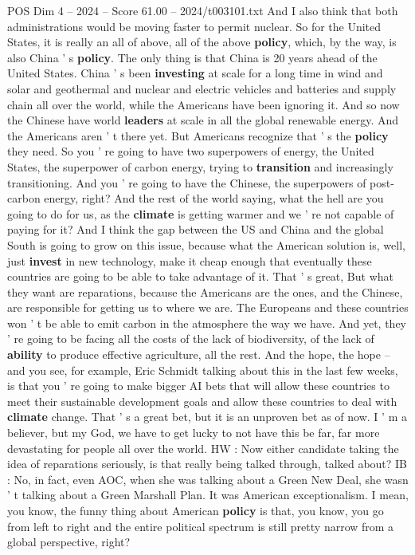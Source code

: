 \begin{textsample}{POS Dim 4 – 2024 – Score 61.00 – 2024/t003101.txt}
And I also think that both administrations would be moving faster to permit nuclear.
So for the United States, it is really an all of above, all of the above \textbf{policy}, which, by the way, is also China ' s \textbf{policy}.
The only thing is that China is 20 years ahead of the United States.
China ' s been \textbf{investing} at scale for a long time in wind and solar and geothermal and nuclear and electric vehicles and batteries and supply chain all over the world, while the Americans have been ignoring it.
And so now the Chinese have world \textbf{leaders} at scale in all the global renewable energy.
And the Americans aren ' t there yet.
But Americans recognize that ' s the \textbf{policy} they need.
So you ' re going to have two superpowers of energy, the United States, the superpower of carbon energy, trying to \textbf{transition} and increasingly transitioning.
And you ' re going to have the Chinese, the superpowers of post-carbon energy, right?
And the rest of the world saying, what the hell are you going to do for us, as the \textbf{climate} is getting warmer and we ' re not capable of paying for it?
And I think the gap between the US and China and the global South is going to grow on this issue, because what the American solution is, well, just \textbf{invest} in new technology, make it cheap enough that eventually these countries are going to be able to take advantage of it.
That ' s great, But what they want are reparations, because the Americans are the ones, and the Chinese, are responsible for getting us to where we are.
The Europeans and these countries won ' t be able to emit carbon in the atmosphere the way we have.
And yet, they ' re going to be facing all the costs of the lack of biodiversity, of the lack of \textbf{ability} to produce effective agriculture, all the rest.
And the hope, the hope -- and you see, for example, Eric Schmidt talking about this in the last few weeks, is that you ' re going to make bigger AI bets that will allow these countries to meet their sustainable development goals and allow these countries to deal with \textbf{climate} change.
That ' s a great bet, but it is an unproven bet as of now.
I ' m a believer, but my God, we have to get lucky to not have this be far, far more devastating for people all over the world.
HW : Now either candidate taking the idea of reparations seriously, is that really being talked through, talked about?
IB : No, in fact, even AOC, when she was talking about a Green New Deal, she wasn ' t talking about a Green Marshall Plan.
It was American exceptionalism.
I mean, you know, the funny thing about American \textbf{policy} is that, you know, you go from left to right and the entire political spectrum is still pretty narrow from a global perspective, right?

\end{textsample}
